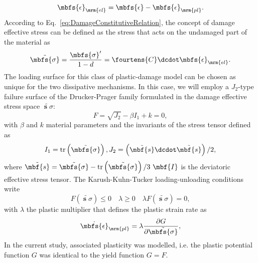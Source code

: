\begin{equation}
    \label{eq:PlasticSplit} 
    \mbfs{\epsilon}_\mrm{el}=\mbfs{\epsilon}-\mbfs{\epsilon}_\mrm{pl}.
\end{equation}
 According to Eq.~\eqref{eq:DamageConstitutiveRelation}, the concept of damage effective stress can be defined as the stress that acts on the undamaged part of the material as
\begin{equation}
    \label{eq:DamEffStress}
    \tilde{\mbfs{\sigma}} = \frac{\mbfs{\sigma}'}{ 1-d }  = \fourtens{C} \dcdot \mbfs{\epsilon}_\mrm{el}.
\end{equation}
The loading surface for this class of plastic-damage model can be chosen as unique for the two dissipative mechanisms. In this case, we will employ a $J_2$-type failure surface of the Drucker-Prager family formulated in the damage effective stress space $\tilde{\mbfs{\sigma}}$:
\begin{equation}\label{eq:dp_y}
F=\sqrt{J_2}-\beta I_1+k=0,
\end{equation}
with $\beta$ and $k$ material parameters and the invariants of the stress tensor defined as
\begin{equation}\label{eq:invar}
\begin{split}
I_1=\text{tr}\left( \tilde{\mbfs{\sigma}}  \right), J_2=\left(  \tilde{\mbf{s}} \dcdot  \tilde{\mbf{s}} \right)/2,
\end{split}
\end{equation}
where $\tilde{\mbf{s}} = \tilde{\mbfs{\sigma}} - \text{tr}\left( \tilde{\mbfs{\sigma}} \right)/3\ \mbf{I}$ is the deviatoric effective stress tensor. The Karush-Kuhn-Tucker loading-unloading conditions write
\begin{equation}\label{eq:kuh_tuc}
F\left( \tilde{\mbfs{\sigma}} \right)\leq0 \quad {\lambda}\geq0 \quad {\lambda} F\left( \tilde{\mbfs{\sigma}} \right)=0,
\end{equation}
with $\lambda$ the plastic multiplier that defines the plastic strain rate as
\begin{equation}\label{eq:plas_mult}
\dot{\mbfs{\epsilon}}_\mrm{pl}=\lambda \frac{\partial G}{\partial \tilde{\mbfs{\sigma}}},
\end{equation}
In the current study, associated plasticity was modelled, i.e. the plastic potential function $G$ was identical to the yield function $G=F$.

